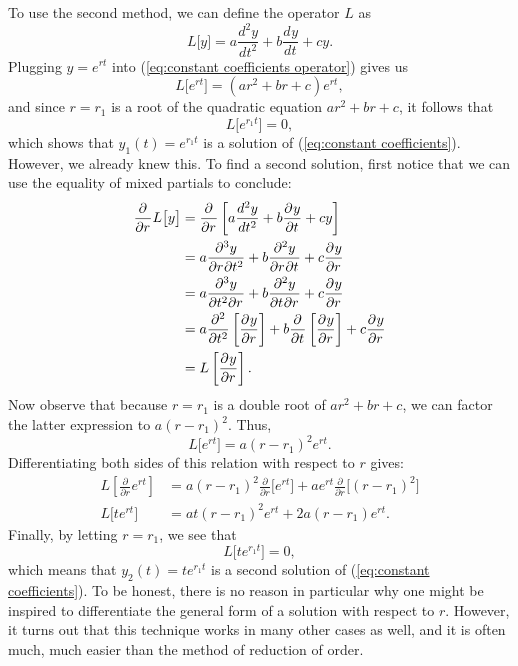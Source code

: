 \documentclass{myart}
\newcommand{\eq}[1]{(\ref{eq:#1})}
\newcommand{\deriv}[3][]{\frac{d^{#1}#2}{d#3^{#1}}}
\newcommand{\pderiv}[3][]{\frac{\partial^{#1}#2}{\partial#3^{#1}}}
\newcommand{\ppderiv}[5]{
  \frac{\partial^{
        \the\numexpr \ifstrempty{#3}{1}{#3}
      + \ifstrempty{#5}{1}{#5}
        \relax}
      #1}
    {\partial#4^{#5} \partial#2^{#3}}}
\begin{document}
To use the second method, we can define the operator $L$ as
\begin{equation} \label{eq:constant coefficients operator}
  L\big[y\big] = a \deriv[2]{y}{t} + b \deriv{y}{t} + cy.
\end{equation}
Plugging $y = e^{rt}$ into \eq{constant coefficients operator} gives
us
\begin{equation*}
  L\big[e^{rt}\big] = (ar^2 + br + c)e^{rt},
\end{equation*}
and since $r = r_1$ is a root of the quadratic equation $ar^2 + br +
c$, it follows that
\begin{equation*}
  L\big[e^{r_1t}\big] = 0,
\end{equation*}
which shows that $y_1(t) = e^{r_1t}$ is a solution of \eq{constant
  coefficients}. However, we already knew this. To find a second
solution, first notice that we can use the equality of mixed partials
to conclude:
\begin{align*}
     \pderiv{}{r} L\big[y\big]
  &= \pderiv{}{r} \left[  a \deriv[2]{y}{t}
                        + b \pderiv{y}{t}
                        + cy\right] \\
  &= a \ppderiv{y}{t}{2}{r}{}
   + b \ppderiv{y}{t}{}{r}{}
   + c \pderiv{y}{r} \\
  &= a \ppderiv{y}{r}{}{t}{2}
   + b \ppderiv{y}{r}{}{t}{}
   + c \pderiv{y}{r} \\
  &= a \pderiv[2]{}{t} \left[\pderiv{y}{r}\right]
   + b \pderiv{}{t} \left[\pderiv{y}{r}\right]
   + c \pderiv{y}{r} \\
  &= L\left[\pderiv{y}{r}\right].
\end{align*}
Now observe that because $r = r_1$ is a double root of $ar^2 + br +
c$, we can factor the latter expression to $a(r - r_1)^2$. Thus,
\begin{equation*}
  L\big[e^{rt}\big] = a(r - r_1)^2e^{rt}.
\end{equation*}
Differentiating both sides of this relation with respect to $r$ gives:
\begin{align*}
     L\left[\pderiv{}{r} e^{rt}\right]
  &= a(r - r_1)^2 \pderiv{}{r} \Big[e^{rt}\Big]
   + ae^{rt} \pderiv{}{r} \Big[(r - r_1)^2\Big] \\
  L\big[te^{rt}\big] &= at(r - r_1)^2e^{rt} + 2a(r - r_1)e^{rt}.
\end{align*}
Finally, by letting $r = r_1$, we see that
\begin{equation*}
  L\big[te^{r_1t}\big] = 0,
\end{equation*}
which means that $y_2(t) = te^{r_1t}$ is a second solution of
\eq{constant coefficients}. To be honest, there is no reason in
particular why one might be inspired to differentiate the general form
of a solution with respect to $r$. However, it turns out that this
technique works in many other cases as well, and it is often much,
much easier than the method of reduction of order.
\end{document}
